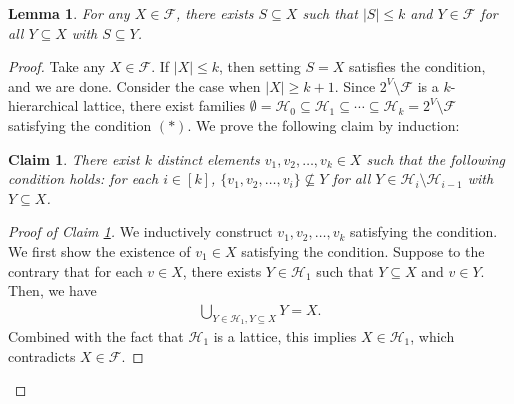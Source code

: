 \documentclass[11pt,letterpaper]{article}
\theoremstyle{plain}
\newtheorem{lemma}[theorem]{Lemma}
\newtheorem{claim}[theorem]{Claim}
\theoremstyle{definition}
\begin{document}
\begin{lemma}
\label{lem:key}
For any $X\in \mathcal{F}$, there exists $S\subseteq X$ such that $|S|\le k$ and $Y\in \mathcal{F}$ for all $Y\subseteq X$ with $S\subseteq Y$.
\end{lemma}
\begin{proof}
Take any $X\in \mathcal{F}$.
If $|X|\le k$, then setting $S=X$ satisfies the condition, and we are done.
Consider the case when $|X|\ge k+1$.
Since $2^V\setminus \mathcal{F}$ is a $k$-hierarchical lattice, there exist families $\emptyset=\mathcal{H}_0\subseteq \mathcal{H}_1\subseteq  \cdots \subseteq \mathcal{H}_k=2^V\setminus \mathcal{F}$ satisfying the condition $(*)$.
We prove the following claim by induction:
\begin{claim}
\label{clm:induction}
There exist $k$ distinct elements $v_1,v_2,\ldots,v_k\in X$ such that the following condition holds: for each $i\in [k]$, $\{v_1,v_2,\ldots,v_i\}\not\subseteq Y$ for all $Y\in \mathcal{H}_i\setminus \mathcal{H}_{i-1}$ with $Y\subseteq X$.
\end{claim}
\begin{proof}[Proof of Claim \ref{clm:induction}]
We inductively construct $v_1,v_2,\ldots,v_k$ satisfying the condition.
We first show the existence of $v_1\in X$ satisfying the condition.
Suppose to the contrary that for each $v\in X$, there exists $Y\in \mathcal{H}_1$ such that $Y\subseteq X$ and $v\in Y$.
Then, we have
\begin{align*}
\bigcup_{Y\in \mathcal{H}_1,Y\subseteq X}Y=X.
\end{align*}
Combined with the fact that $\mathcal{H}_1$ is a lattice, this implies $X\in \mathcal{H}_1$, which contradicts $X\in \mathcal{F}$.


\end{proof}
\end{proof}
\end{document}
